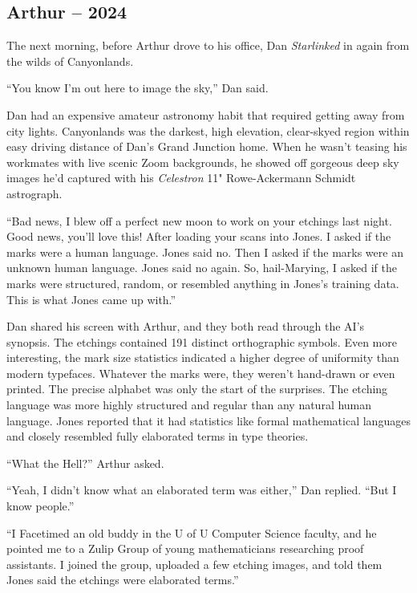 \hypertarget{arthur-2024}{%
\subsection*{Arthur -- 2024}\label{arthur-2024}}

The next morning, before Arthur drove to his office, Dan
\emph{Starlinked} in again from the wilds of Canyonlands.

``You know I'm out here to image the sky,'' Dan said.

Dan had an expensive amateur astronomy habit that required getting away
from city lights. Canyonlands was the darkest, high elevation,
clear-skyed region within easy driving distance of Dan's Grand Junction
home. When he wasn't teasing his workmates with live scenic Zoom
backgrounds, he showed off gorgeous deep sky images he'd captured with
his \emph{Celestron} 11" Rowe-Ackermann Schmidt astrograph.

``Bad news, I blew off a perfect new moon to work on your etchings last
night. Good news, you'll love this! After loading your scans into Jones.
I asked if the marks were a human language. Jones said no. Then I asked
if the marks were an unknown human language. Jones said no again. So,
hail-Marying, I asked if the marks were structured, random, or resembled
anything in Jones's training data. This is what Jones came up with.''

Dan shared his screen with Arthur, and they both read through the AI's
synopsis. The etchings contained 191 distinct orthographic symbols. Even
more interesting, the mark size statistics indicated a higher degree of
uniformity than modern typefaces. Whatever the marks were, they weren't
hand-drawn or even printed. The precise alphabet was only the start of
the surprises. The etching language was more highly structured and
regular than any natural human language. Jones reported that it had
statistics like formal mathematical languages and closely resembled
fully elaborated terms in type theories.

``What the Hell?'' Arthur asked.

``Yeah, I didn't know what an elaborated term was either,'' Dan replied.
``But I know people.''

``I Facetimed an old buddy in the U of U Computer Science faculty, and
he pointed me to a Zulip Group of young mathematicians researching proof
assistants. I joined the group, uploaded a few etching images, and told
them Jones said the etchings were elaborated terms.''


